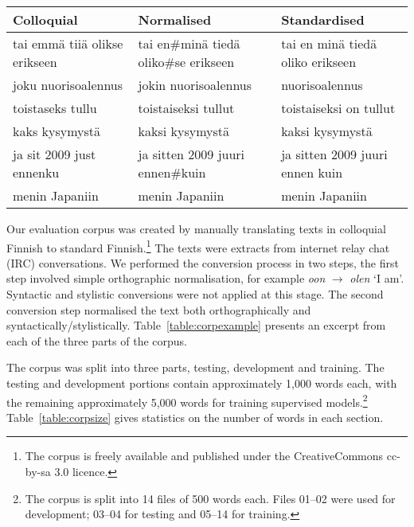 \documentclass[11pt]{article}
\begin{document}
\begin{table*}
  \centering
  \begin{tabular}{|l|l|l|}
  \hline
  \textbf{Colloquial} & \textbf{Normalised} & \textbf{Standardised} \\
  \hline
  tai emm\"{a} tii\"{a} olikse erikseen & tai en\#min\"{a} tied\"{a} oliko\#se erikseen & tai en min\"{a} tied\"{a} oliko erikseen \\
  joku nuorisoalennus                             & jokin nuorisoalennus & nuorisoalennus \\
  \hline
   toistaseks tullu        & toistaiseksi tullut  & toistaiseksi on tullut  \\
   kaks kysymyst\"{a}       & kaksi kysymyst\"{a} & kaksi kysymyst\"{a} \\
  \hline
  ja sit 2009 just ennenku & ja sitten 2009 juuri ennen\#kuin  & ja sitten 2009 juuri ennen kuin  \\ 
menin Japaniin & menin Japaniin & menin Japaniin
 \\
  \hline
  \end{tabular}
  \caption{Example sentences from the parallel corpus. The \texttt{\#} mark represents a missing
    word boundary.}
  \label{table:corpexample}
\end{table*}

Our evaluation corpus was created by manually translating texts in colloquial Finnish
to standard Finnish.\footnote{The corpus is freely available and published under the 
CreativeCommons {\sc cc-by-sa} 3.0 licence.} The texts were extracts from internet 
relay chat (IRC) conversations. We performed the conversion process in two steps, the first
step involved simple orthographic normalisation, for 
example \emph{oon} $\rightarrow$ \emph{olen} `I am'. Syntactic and stylistic conversions 
were not applied at this stage. The second conversion step normalised the text
both orthographically and syntactically/stylistically. Table~\ref{table:corpexample} presents
an excerpt from each of the three parts of the corpus.

The corpus was split into three parts, testing, development and training. The testing
and development portions contain approximately 1,000 words each, with the remaining approximately 5,000 words for training
supervised models.\footnote{The corpus is split into 14 files of 500 words each. Files 01--02 
  were used for development; 03--04 for testing and 05--14 for training.} Table~\ref{table:corpsize} gives statistics on the number of words in each section.
\end{document}
